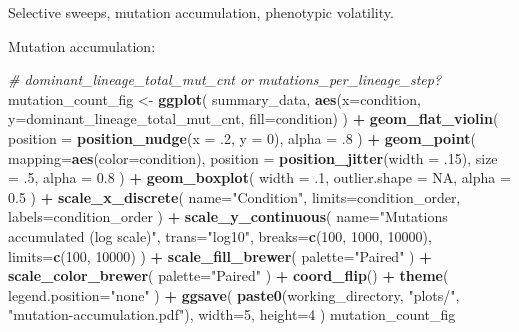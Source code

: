 \documentclass[]{book}
\newenvironment{Shaded}{\begin{snugshade}}{\end{snugshade}}
\newcommand{\CommentTok}[1]{\textcolor[rgb]{0.56,0.35,0.01}{\textit{#1}}}
\newcommand{\DataTypeTok}[1]{\textcolor[rgb]{0.13,0.29,0.53}{#1}}
\newcommand{\DecValTok}[1]{\textcolor[rgb]{0.00,0.00,0.81}{#1}}
\newcommand{\FloatTok}[1]{\textcolor[rgb]{0.00,0.00,0.81}{#1}}
\newcommand{\KeywordTok}[1]{\textcolor[rgb]{0.13,0.29,0.53}{\textbf{#1}}}
\newcommand{\NormalTok}[1]{#1}
\newcommand{\OperatorTok}[1]{\textcolor[rgb]{0.81,0.36,0.00}{\textbf{#1}}}
\newcommand{\OtherTok}[1]{\textcolor[rgb]{0.56,0.35,0.01}{#1}}
\newcommand{\StringTok}[1]{\textcolor[rgb]{0.31,0.60,0.02}{#1}}
\begin{document}
Selective sweeps, mutation accumulation, phenotypic volatility.

Mutation accumulation:

\begin{Shaded}
\begin{Highlighting}[]
\CommentTok{# dominant_lineage_total_mut_cnt or mutations_per_lineage_step?}
\NormalTok{mutation_count_fig <-}\StringTok{ }\KeywordTok{ggplot}\NormalTok{(}
\NormalTok{    summary_data,}
    \KeywordTok{aes}\NormalTok{(}\DataTypeTok{x=}\NormalTok{condition, }\DataTypeTok{y=}\NormalTok{dominant_lineage_total_mut_cnt, }\DataTypeTok{fill=}\NormalTok{condition)}
\NormalTok{  ) }\OperatorTok{+}
\StringTok{  }\KeywordTok{geom_flat_violin}\NormalTok{(}
    \DataTypeTok{position =} \KeywordTok{position_nudge}\NormalTok{(}\DataTypeTok{x =} \FloatTok{.2}\NormalTok{, }\DataTypeTok{y =} \DecValTok{0}\NormalTok{),}
    \DataTypeTok{alpha =} \FloatTok{.8}
\NormalTok{  ) }\OperatorTok{+}
\StringTok{  }\KeywordTok{geom_point}\NormalTok{(}
    \DataTypeTok{mapping=}\KeywordTok{aes}\NormalTok{(}\DataTypeTok{color=}\NormalTok{condition),}
    \DataTypeTok{position =} \KeywordTok{position_jitter}\NormalTok{(}\DataTypeTok{width =} \FloatTok{.15}\NormalTok{),}
    \DataTypeTok{size =} \FloatTok{.5}\NormalTok{,}
    \DataTypeTok{alpha =} \FloatTok{0.8}
\NormalTok{  ) }\OperatorTok{+}
\StringTok{  }\KeywordTok{geom_boxplot}\NormalTok{(}
    \DataTypeTok{width =} \FloatTok{.1}\NormalTok{,}
    \DataTypeTok{outlier.shape =} \OtherTok{NA}\NormalTok{,}
    \DataTypeTok{alpha =} \FloatTok{0.5}
\NormalTok{  ) }\OperatorTok{+}
\StringTok{  }\KeywordTok{scale_x_discrete}\NormalTok{(}
    \DataTypeTok{name=}\StringTok{"Condition"}\NormalTok{,}
    \DataTypeTok{limits=}\NormalTok{condition_order,}
    \DataTypeTok{labels=}\NormalTok{condition_order}
\NormalTok{  ) }\OperatorTok{+}
\StringTok{  }\KeywordTok{scale_y_continuous}\NormalTok{(}
    \DataTypeTok{name=}\StringTok{"Mutations accumulated (log scale)"}\NormalTok{,}
    \DataTypeTok{trans=}\StringTok{"log10"}\NormalTok{,}
    \DataTypeTok{breaks=}\KeywordTok{c}\NormalTok{(}\DecValTok{100}\NormalTok{, }\DecValTok{1000}\NormalTok{, }\DecValTok{10000}\NormalTok{),}
    \DataTypeTok{limits=}\KeywordTok{c}\NormalTok{(}\DecValTok{100}\NormalTok{, }\DecValTok{10000}\NormalTok{)}
\NormalTok{  ) }\OperatorTok{+}
\StringTok{  }\KeywordTok{scale_fill_brewer}\NormalTok{(}
    \DataTypeTok{palette=}\StringTok{"Paired"}
\NormalTok{  ) }\OperatorTok{+}
\StringTok{  }\KeywordTok{scale_color_brewer}\NormalTok{(}
    \DataTypeTok{palette=}\StringTok{"Paired"}
\NormalTok{  ) }\OperatorTok{+}
\StringTok{  }\KeywordTok{coord_flip}\NormalTok{() }\OperatorTok{+}
\StringTok{  }\KeywordTok{theme}\NormalTok{(}
    \DataTypeTok{legend.position=}\StringTok{"none"}
\NormalTok{  ) }\OperatorTok{+}
\StringTok{  }\KeywordTok{ggsave}\NormalTok{(}
    \KeywordTok{paste0}\NormalTok{(working_directory, }\StringTok{"plots/"}\NormalTok{, }\StringTok{"mutation-accumulation.pdf"}\NormalTok{),}
    \DataTypeTok{width=}\DecValTok{5}\NormalTok{,}
    \DataTypeTok{height=}\DecValTok{4}
\NormalTok{  )}
\NormalTok{mutation_count_fig}
\end{Highlighting}
\end{Shaded}
\end{document}
